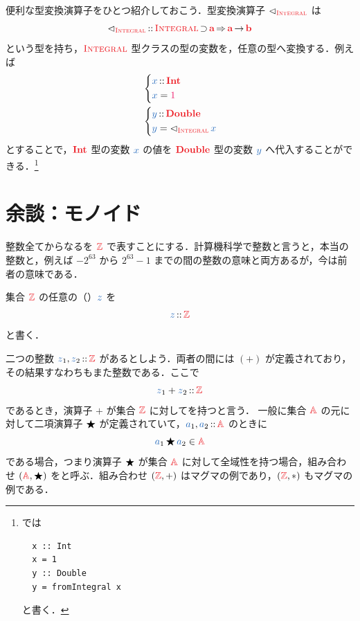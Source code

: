 \documentclass[a5paper,twoside,fleqn,draft]{jsbook}
\begin{document}
便利な型変換演算子をひとつ紹介しておこう．型変換演算子
$\hFromIntegral$ は
\begin{equation}
  \hFromIntegral
  \hIsTypeOf{}\hIntegral\hHasElementsOf\hTypeName{a}
  \hAndThen\hTypeName{a}\hFunctionArrow\hTypeName{b}
\end{equation}
という型を持ち，$\hIntegral$ 型クラスの型の変数を，任意の型へ変換する．例えば
\begin{align}
  {}
  &\left\{
  \begin{aligned}
    \hVar{x}
    &\hIsTypeOf\hInt\\
    \hVar{x}
    &=\hConstant{1}
  \end{aligned}
  \right.\\
    {}
    &\left\{
    \begin{aligned}
      \hVar{y}
      &\hIsTypeOf\hDouble\\
      \hVar{y}
      &=\hFromIntegral\hVar{x}
    \end{aligned}
  \right.
\end{align}
とすることで，$\hInt$ 型の変数 $\hVar{x}$ の値を $\hDouble$ 型の変数 $\hVar{y}$ へ代入することができる．\footnote{\haskell では
\begin{verbatim}
  x :: Int
  x = 1
  y :: Double
  y = fromIntegral x
\end{verbatim}
と書く．}

\separator


\section{余談：モノイド}

整数全てからなるを $\hSet{Z}$ で表すことにする．計算機科学で整数と言うと，本当の整数と，例えば $-2^{63}$ から $2^{63}-1$ までの間の整数の意味と両方あるが，今は前者の意味である．

集合 $\hSet{Z}$ の任意の（）$\hVar{z}$ を
\begin{equation}
  \hVar{z}
  \hIsTypeOf\hSet{Z}
\end{equation}
と書く．

二つの整数 $\hVar{z}_1,\hVar{z}_2\hIsTypeOf\hSet{Z}$ があるとしよう．両者の間には $(+)$ が定義されており，その結果すなわちもまた整数である．ここで
\begin{equation}
  \hVar{z}_1+\hVar{z}_2
  \hIsTypeOf\hSet{Z}
\end{equation}
であるとき，演算子 $+$ が集合 $\hSet{Z}$ に対してを持つと言う．
一般に集合 $\hSet{A}$ の元に対して二項演算子 $\operatorname{\bigstar}$ が定義されていて，$\hVar{a}_1,\hVar{a}_2\hIsTypeOf\hSet{A}$ のときに
\begin{equation}
  \label{eq:totality}
  \hVar{a}_1\hAnyBinOp \hVar{a}_2
  \in\hSet{A}
\end{equation}
である場合，つまり演算子 $\operatorname{\bigstar}$ が集合 $\hSet{A}$ に対して全域性を持つ場合，組み合わせ $\hSingleTuppleWith{\hSet{A},\hAnyBinOp}$ をと呼ぶ．組み合わせ $\hSingleTuppleWith{\hSet{Z},+}$ はマグマの例であり，$\hSingleTuppleWith{\hSet{Z},*}$ もマグマの例である．
\end{document}
